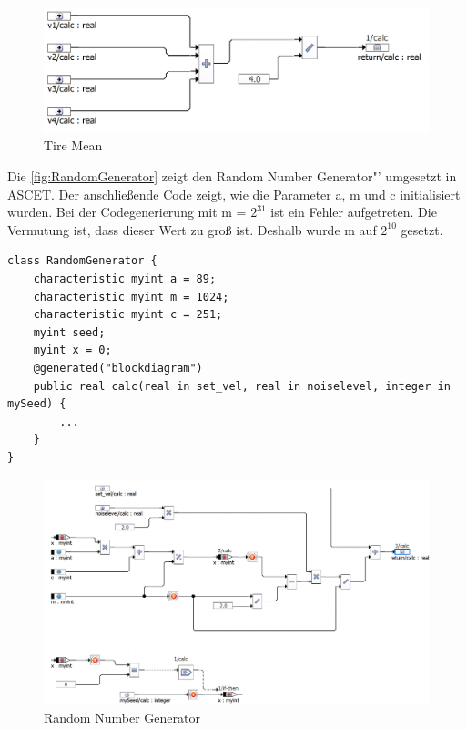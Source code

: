 \begin{figure}[h!]
	\centering
	\includegraphics[width=1\linewidth]{../Graphiken/TireMean.png}
	\caption{Tire Mean}
	\label{fig:TireMean}
\end{figure}

\pagebreak
Die \autoref{fig:RandomGenerator} zeigt den \glqq Random Number Generator"' umgesetzt in ASCET.
Der anschließende Code zeigt, wie die Parameter a, m und c initialisiert wurden. Bei der Codegenerierung mit m = $2^{31}$ ist ein Fehler aufgetreten. Die Vermutung ist, dass dieser Wert zu groß ist. Deshalb wurde m auf $2^{10}$ gesetzt.\\
\begin{lstlisting}
class RandomGenerator {
	characteristic myint a = 89;
	characteristic myint m = 1024;
	characteristic myint c = 251;
	myint seed;
	myint x = 0;
	@generated("blockdiagram")
	public real calc(real in set_vel, real in noiselevel, integer in mySeed) {
		...
	}
}
\end{lstlisting}

\begin{figure}[h!]
	\centering
	\includegraphics[width=1\linewidth]{../Graphiken/RandomGenerator.png}
	\caption{Random Number Generator}
	\label{fig:RandomGenerator}
\end{figure}